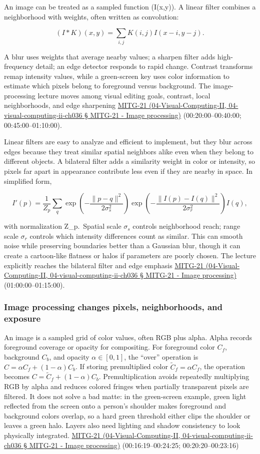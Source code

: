 An image can be treated as a sampled function (I(x,y)). A linear filter combines a neighborhood with weights, often written as convolution:

\[
(I*K)(x,y)=\sum_{i,j}K(i,j)I(x-i,y-j).
\]

A blur uses weights that average nearby values; a sharpen filter adds high-frequency detail; an edge detector responds to rapid change. Contrast transforms remap intensity values, while a green-screen key uses color information to estimate which pixels belong to foreground versus background. The image-processing lecture moves among visual editing goals, contrast, local neighborhoods, and edge sharpening \href{}{MITG-21 (04-Visual-Computing-II, 04-visual-computing-ii-ch036 § MITG-21 - Image processing)} (00:20:00--00:40:00; 00:45:00--01:10:00).

Linear filters are easy to analyze and efficient to implement, but they blur across edges because they treat similar spatial neighbors alike even when they belong to different objects. A bilateral filter adds a similarity weight in color or intensity, so pixels far apart in appearance contribute less even if they are nearby in space. In simplified form,

\[
I'(p)=\frac{1}{Z_p}\sum_q \exp\!\left(-\frac{\|p-q\|^2}{2\sigma_s^2}\right)\exp\!\left(-\frac{\|I(p)-I(q)\|^2}{2\sigma_r^2}\right)I(q),
\]

with normalization Z\_p.~Spatial scale \(\sigma_s\) controls neighborhood reach; range scale \(\sigma_r\) controls which intensity differences count as similar. This can smooth noise while preserving boundaries better than a Gaussian blur, though it can create a cartoon-like flatness or halos if parameters are poorly chosen. The lecture explicitly reaches the bilateral filter and edge emphasis \href{}{MITG-21 (04-Visual-Computing-II, 04-visual-computing-ii-ch036 § MITG-21 - Image processing)} (01:00:00--01:15:00).

\subsubsection{Image processing changes pixels, neighborhoods, and exposure}\label{image-processing-changes-pixels-neighborhoods-and-exposure}

An image is a sampled grid of color values, often RGB plus alpha. Alpha records foreground coverage or opacity for compositing. For foreground color \(C_f\), background \(C_b\), and opacity \(\alpha\in[0,1]\), the ``over'' operation is \(C=\alpha C_f+(1-\alpha)C_b\). If storing premultiplied color \(\tilde C_f=\alpha C_f\), the operation becomes \(C=\tilde C_f+(1-\alpha)C_b\). Premultiplication avoids repeatedly multiplying RGB by alpha and reduces colored fringes when partially transparent pixels are filtered. It does not solve a bad matte: in the green-screen example, green light reflected from the screen onto a person's shoulder makes foreground and background colors overlap, so a hard green threshold either clips the shoulder or leaves a green halo. Layers also need lighting and shadow consistency to look physically integrated. \href{}{MITG-21 (04-Visual-Computing-II, 04-visual-computing-ii-ch036 § MITG-21 - Image processing)} (00:16:19--00:24:25; 00:20:20--00:23:16)

